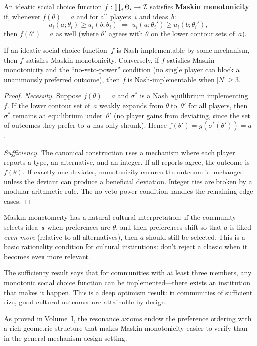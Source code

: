 \begin{definition}
\label{def:maskin-mono}
An ideatic social choice function $f : \prod_i \Theta_i \to \mathcal{I}$
satisfies \textbf{Maskin monotonicity} if, whenever $f(\theta) = a$
and for all players~$i$ and ideas~$b$:
\[
  u_i(a; \theta_i) \ge u_i(b; \theta_i)
  \;\Longrightarrow\;
  u_i(a; \theta_i') \ge u_i(b; \theta_i'),
\]
then $f(\theta') = a$ as well (where $\theta'$ agrees with $\theta$
on the lower contour sets of~$a$).
\end{definition}

\begin{theorem}
\label{thm:maskin}
If an ideatic social choice function~$f$ is Nash-implementable by
some mechanism, then $f$ satisfies Maskin monotonicity.  Conversely,
if $f$ satisfies Maskin monotonicity and the ``no-veto-power''
condition (no single player can block a unanimously preferred outcome),
then $f$ is Nash-implementable when $|N| \ge 3$.
\end{theorem}

\begin{proof}
\emph{Necessity.}  Suppose $f(\theta) = a$ and $\sigma^*$ is a Nash
equilibrium implementing~$f$.  If the lower contour set of~$a$ weakly
expands from $\theta$ to~$\theta'$ for all players, then $\sigma^*$
remains an equilibrium under~$\theta'$ (no player gains from deviating,
since the set of outcomes they prefer to~$a$ has only shrunk).  Hence
$f(\theta') = g(\sigma^*(\theta')) = a$.

\emph{Sufficiency.}  The canonical construction uses a mechanism where
each player reports a type, an alternative, and an integer.  If all
reports agree, the outcome is~$f(\theta)$.  If exactly one deviates,
monotonicity ensures the outcome is unchanged unless the deviant
can produce a beneficial deviation.  Integer ties are broken by a
modular arithmetic rule.  The no-veto-power condition handles the
remaining edge cases.
\end{proof}

\begin{interpretation}
Maskin monotonicity has a natural cultural interpretation: if the
community selects idea~$a$ when preferences are $\theta$, and then
preferences shift so that $a$ is liked \emph{even more} (relative
to all alternatives), then $a$ should still be selected.  This is
a basic rationality condition for cultural institutions: don't
reject a classic when it becomes even more relevant.

The sufficiency result says that for communities with at least three
members, any monotonic social choice function can be implemented---there
exists an institution that makes it happen.  This is a deep optimism
result: in communities of sufficient size, good cultural outcomes are
attainable by design.

As proved in Volume~I, the resonance axioms endow the preference
ordering with a rich geometric structure that makes Maskin monotonicity
easier to verify than in the general mechanism-design setting.
\end{interpretation}

